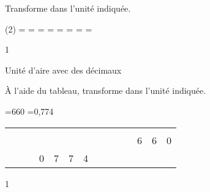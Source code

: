 \documentclass[a4paper,11pt]{report}
\begin{document}
\begin{exop}
{
Transforme dans l'unité indiquée.
\begin{tasks}(2)
    \task {}= \dotfill \hspace{0.3cm}
     \hspace{0.3cm}
    \task {} = \dotfill \hspace{0.3cm}
     \hspace{0.3cm}
  \task {}= \dotfill \hspace{0.3cm}
     \hspace{0.3cm}
    \task {}= \dotfill \hspace{0.3cm}
     \hspace{0.3cm}
     \task {}= \dotfill \hspace{0.3cm}
     \hspace{0.3cm}
     \task {}= \dotfill \hspace{0.3cm}
     \hspace{0.3cm}
     \task {}= \dotfill \hspace{0.3cm}
     \hspace{0.3cm}
     \task {}= \dotfill \hspace{0.3cm}
     \hspace{0.3cm}
\end{tasks} 
}
{1}
\end{exop}

\begin{resolu}
{Unité d'aire avec des décimaux}    
{À l'aide du tableau, transforme dans l'unité indiquée.

\begin{tasks}
   \task {}=660
     \hspace{0.3cm}
    \task {} =0,774
     \hspace{0.3cm}
\end{tasks}
\begin{center}


\begin{tabular}{*{14}{|x{0.7cm}}|}
 \hline
{} &  & &&&&\\
 &   & & & & &  &   & & & & 6& 6&0\\ 
 \hline

 &   & &0 & 7& 7& 4 &   & & & & & &\\

\hline

\end{tabular}
\end{center}
}
{1}
\end{resolu}
\end{document}
